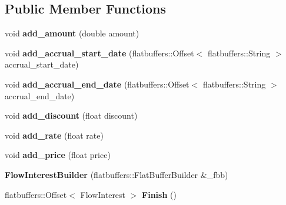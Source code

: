 \subsection*{Public Member Functions}
\begin{DoxyCompactItemize}
\item 
\mbox{\label{structquantra_1_1FlowInterestBuilder_af7424059a3ce706b6b9aae705e19c1f8}} 
void {\bfseries add\+\_\+amount} (double amount)
\item 
\mbox{\label{structquantra_1_1FlowInterestBuilder_a32c5350de9c05ac7b675d48b8974c9f0}} 
void {\bfseries add\+\_\+accrual\+\_\+start\+\_\+date} (flatbuffers\+::\+Offset$<$ flatbuffers\+::\+String $>$ accrual\+\_\+start\+\_\+date)
\item 
\mbox{\label{structquantra_1_1FlowInterestBuilder_a949f5c0ccf619f7c15e0c6ae6e6acb5b}} 
void {\bfseries add\+\_\+accrual\+\_\+end\+\_\+date} (flatbuffers\+::\+Offset$<$ flatbuffers\+::\+String $>$ accrual\+\_\+end\+\_\+date)
\item 
\mbox{\label{structquantra_1_1FlowInterestBuilder_a1200efd055ba511bdabfbd2d5a9f3e29}} 
void {\bfseries add\+\_\+discount} (float discount)
\item 
\mbox{\label{structquantra_1_1FlowInterestBuilder_a2b35605c938c635d39748ccb58bed5c6}} 
void {\bfseries add\+\_\+rate} (float rate)
\item 
\mbox{\label{structquantra_1_1FlowInterestBuilder_a4ee6a971fb7a04d64b7a5960dedad4df}} 
void {\bfseries add\+\_\+price} (float price)
\item 
\mbox{\label{structquantra_1_1FlowInterestBuilder_a28ec59385c7cf4ba22dcb2244faf6d25}} 
{\bfseries Flow\+Interest\+Builder} (flatbuffers\+::\+Flat\+Buffer\+Builder \&\+\_\+fbb)
\item 
\mbox{\label{structquantra_1_1FlowInterestBuilder_a9f628e0afe32f445bb1b3d5b1738cf9a}} 
flatbuffers\+::\+Offset$<$ Flow\+Interest $>$ {\bfseries Finish} ()

\end{DoxyCompactItemize}
